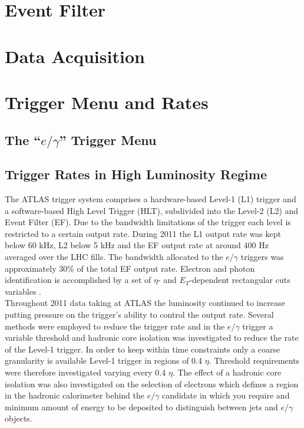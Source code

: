 \section{Event Filter}

	



\section{Data Acquisition}




\section{Trigger Menu and Rates}
\label{sec:trig_menu}

\subsection{The ``$e/\gamma$'' Trigger Menu} 














\subsection{Trigger Rates in High Luminosity Regime}

	The ATLAS trigger system comprises a
	hardware-based Level-1 (L1) trigger and a software-based
	High Level Trigger (HLT), subdivided into the Level-2
	(L2) and Event Filter (EF). Due to the bandwidth
	limitations of the trigger each level is restricted to a
	certain output rate. During 2011 the L1 output rate was
	kept below 60 kHz, L2 below 5 kHz and the EF output
	rate at around 400 Hz averaged over the LHC fills. The
	bandwidth allocated to the $e/\gamma$ triggers was
	approximately 30\% of the total EF output rate.
	Electron and photon identification is accomplished by a
	set of $\eta$- and $E_{T}$-dependent rectangular cuts variables
	\cite{trig1, trig2}.\\
	Throughout 2011 data taking at ATLAS the luminosity continued to increase putting pressure on the trigger's ability to control the output rate. Several methods were employed to reduce the trigger rate and in the $e/\gamma$ trigger a variable threshold and hadronic core isolation was investigated to reduce the rate of the Level-1 trigger. In order to keep within time constraints only a coarse granularity is available Level-1 trigger in regions of 0.4 $\eta$. Threshold requirements were therefore investigated varying every 0.4 $\eta$. The effect of a hadronic core isolation was also investigated on the selection of electrons which defines a region in the hadronic calorimeter behind the $e/\gamma$ candidate in which you require and minimum amount of energy to be deposited to distinguish between jets and $e/\gamma$ objects. 


